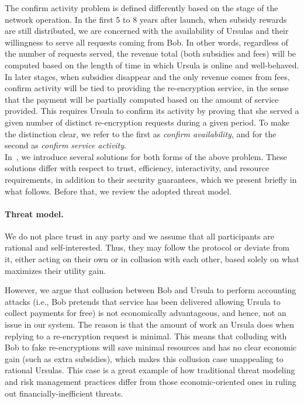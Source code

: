 \documentclass{llncs}
\begin{document}
 The confirm activity problem is defined differently based on the stage of the network operation. In the first 5 to 8 years after launch, when subsidy rewards are
still distributed, we are concerned with the availability of Ursulas and their willingness to
serve all requests coming from Bob. In other words, regardless of the number of requests served, the revenue total (both subsidies and fees) will be computed based on the length of time in which Ursula
is online and well-behaved. In later stages, when subsidies disappear
and the only revenue comes from fees, confirm activity will be tied to providing the re-encryption
service, in the sense that the payment will be partially computed based on the amount of
service provided. This requires Ursula to confirm its activity by proving that she served 
a given number of distinct re-encryption requests during a given period. To make the distinction 
clear, we refer to the first as \emph{confirm availability}, and for the second as \emph{confirm 
service activity}. \\


 In~\cite{confirm-activity-draft}, we introduce several solutions for both forms of the above problem. These solutions differ with respect to trust, efficiency, interactivity, and resource requirements, in addition to their security guarantees, which we present briefly in what follows. Before that, we review the adopted threat model.


\paragraph{Threat model.} We do not place trust in any party and we assume that all participants are rational and self-interested. Thus, they may follow the protocol or deviate from it, either acting on their own or in collusion with each other, based solely on what maximizes their utility gain. 


However, we argue that collusion between Bob and Ursula to perform accounting attacks (i.e., Bob pretends that service has been delivered allowing Ursula to collect payments for free) is not economically advantageous, and hence, not an issue in our system. The reason is that the amount of work an Ursula does when replying to a re-encryption request is minimal. This means that colluding with Bob to fake re-encryptions will save minimal resources and has no clear economic gain (such as extra subsidies), which makes this collusion case unappealing to rational Ursulas. This case is a great example of how traditional threat modeling and risk management practices differ from those economic-oriented ones in ruling out financially-inefficient threats.
\end{document}
